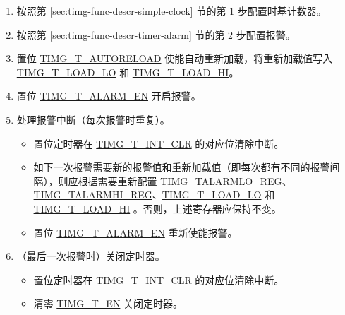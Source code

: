 \documentclass[main\_\_CN.tex]{subfiles}
\begin{document}
\begin{enumerate}
    \item 按照第 \ref{sec:timg-func-descr-simple-clock} 节的第 1 步配置时基计数器。
    \item 按照第 \ref{sec:timg-func-descr-timer-alarm} 节的第 2 步配置报警。
    \item 置位 \hyperref[fielddesc:TIMGTXAUTORELOAD]{TIMG\_T\_AUTORELOAD} 使能自动重新加载，将重新加载值写入 \hyperref[fielddesc:TIMGTXLOADLO]{TIMG\_T\_LOAD\_LO} 和 \hyperref[fielddesc:TIMGTXLOADHI]{TIMG\_T\_LOAD\_HI}。
    \item 置位 \hyperref[fielddesc:TIMGTXALARMEN]{TIMG\_T\_ALARM\_EN} 开启报警。
    \item 处理报警中断（每次报警时重复）。
    \begin{itemize}
        \item 置位定时器在 \hyperref[fielddesc:TIMGTXINTCLR]{TIMG\_T\_INT\_CLR} 的对应位清除中断。
        \item 如下一次报警需要新的报警值和重新加载值（即每次都有不同的报警间隔），则应根据需要重新配置 \hyperref[regdesc:TIMGTXALARMLOREG]{TIMG\_TALARMLO\_REG}、\hyperref[regdesc:TIMGTXALARMHIREG]{TIMG\_TALARMHI\_REG}、\hyperref[fielddesc:TIMGTXLOADLO]{TIMG\_T\_LOAD\_LO} 和 \hyperref[fielddesc:TIMGTXLOADHI]{TIMG\_T\_LOAD\_HI} 。否则，上述寄存器应保持不变。
        \item 置位 \hyperref[fielddesc:TIMGTXALARMEN]{TIMG\_T\_ALARM\_EN} 重新使能报警。
    \end{itemize}
    \item（最后一次报警时）关闭定时器。
    \begin{itemize}
        \item 置位定时器在 \hyperref[fielddesc:TIMGTXINTCLR]{TIMG\_T\_INT\_CLR} 的对应位清除中断。
        \item 清零 \hyperref[fielddesc:TIMGTXEN]{TIMG\_T\_EN} 关闭定时器。
    \end{itemize}
\end{enumerate}
\end{document}
